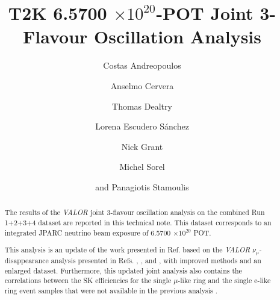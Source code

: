 %
%

\begin{frontmatter}

\title{
  T2K 6.5700 $\times10^{20}$-POT Joint 3-Flavour Oscillation Analysis 
}

\vspace*{0.7cm}

\author[RAL]     {Costas Andreopoulos}
\author[IFIC]    {Anselmo Cervera}
\author[RAL,OXF] {Thomas Dealtry}
\author[IFIC]    {Lorena Escudero S\'anchez}
\author[LANCS]   {Nick Grant}
\author[IFIC]    {Michel Sorel}
\author[IFIC]    {and Panagiotis Stamoulis}

\address[RAL]{Particle Physics Dept., Rutherford Appleton Laboratory, STFC \\
              Harwell Science and Innovation Campus\\
              Oxfordshire OX11 0QX, UK}
\address[OXF]{Subdepartment of Particle Physics, University of Oxford \\
              Denys Wilkinson Building, Keble Road\\
              Oxfordshire OX1 3RH, UK}
\address[LANCS]{Physics Dept., Lancaster University \\
              Lancaster, LA1 4YB, UK}
\address[IFIC]{Instituto de Fisica Corpuscular\\
              CSIC and University of Valencia\\
              Valencia, Spain}

%
%

\begin{abstract}

The results of the {\em VALOR}
joint 3-flavour oscillation analysis on the combined Run 1+2+3+4 dataset 
are reported in this technical note.
This dataset corresponds to an integrated JPARC neutrino beam exposure of 
6.5700 $\times10^{20}$ POT.

This analysis is an update of the work presented in Ref. \cite{OurJointAnalysis} based on the 
{\em VALOR}  $\nu_{\mu}$-disappearance analysis presented in Refs. \cite{OurRun1DisappAnalysis}, 
\cite{OurRun12DisappAnalysis}, \cite{OurRun12DisappAnalysis3Flavour} and \cite{OurRun123DisappAnalysis3Flavour},
with improved methods and an enlarged dataset. 
Furthermore, this updated joint analysis also contains the correlations between the SK efficiencies for the
single $\mu$-like ring and the single e-like ring event samples that were not available in the previous analysis \cite{OurJointAnalysis}.


\end{abstract}
\end{frontmatter}
